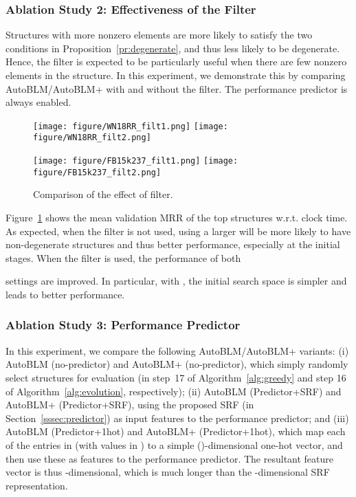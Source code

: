 \documentclass[10pt,journal,compsoc]{IEEEtran}
\begin{document}
\subsubsection{Ablation Study 2: 
Effectiveness of  the
Filter}
\label{exp:filter}

Structures with more nonzero elements are more likely to satisfy the
two conditions in 
Proposition~\ref{pr:degenerate}, and 
thus less likely to be
degenerate.
Hence,
the filter is expected to be particularly useful
when there are few nonzero elements 
in the structure.
In this experiment,
we demonstrate this by
comparing
AutoBLM/AutoBLM+ with and without
the filter.
The performance predictor is always enabled.


\begin{figure}[ht]
	\centering
\texttt{[image: figure/WN18RR\_filt1.png]}\hfill
	\texttt{[image: figure/WN18RR\_filt2.png]}
	
	\texttt{[image: figure/FB15k237\_filt1.png]}\hfill
	\texttt{[image: figure/FB15k237\_filt2.png]}
	\vspace{-10px}
	\caption{Comparison of the effect of filter.}
	\vspace{-10px}
	\label{fig:filter}
\end{figure}

Figure~\ref{fig:filter}
shows the mean 
validation 
MRR 
of the top  structures
w.r.t. clock time.
As expected,
when the filter is not used, using a larger  
will be more likely to have non-degenerate
structures  and thus
better performance, especially at the initial stages.
When the filter is used, the performance of both 
 
settings are improved. In particular,
with ,
the initial search space is simpler and leads to
better performance.


\subsubsection{Ablation Study 3: Performance Predictor}
\label{exp:predictor}

In this experiment, we
compare
the following 
AutoBLM/AutoBLM+
variants: (i)
AutoBLM (no-predictor) and AutoBLM+ (no-predictor), which simply
randomly select  structures for evaluation (in step~17 of
Algorithm~\ref{alg:greedy} and step 16 of
Algorithm~\ref{alg:evolution}, respectively);
(ii)
AutoBLM (Predictor+SRF) and AutoBLM+ (Predictor+SRF),
using the proposed SRF (in Section~\ref{sssec:predictor}) as input features to the performance predictor;
and (iii) AutoBLM (Predictor+1hot) and AutoBLM+ (Predictor+1hot),
which 
map each of
the  entries in  (with values in )
to 
a simple ()-dimensional
one-hot vector, and then 
use these as features to the performance predictor.
The resultant feature vector is thus -dimensional, which is
much longer
than the -dimensional
SRF 
representation.
\end{document}
